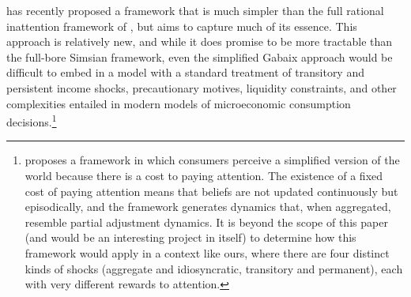 \cite{gabaixSparsityQJE} has recently proposed a framework that is much simpler than the full rational inattention framework of \cite{simsInattention}, but aims to capture much of its essence.  This approach is relatively new, and while it does promise to be more tractable than the full-bore Simsian framework, even the simplified Gabaix approach would be difficult to embed in a model with a standard treatment of transitory and persistent income shocks, precautionary motives, liquidity constraints, and other complexities entailed in modern models of microeconomic consumption decisions.\footnote{\cite{gabaixSparsityQJE} proposes a framework in which consumers perceive a simplified version of the world because there is a cost to paying attention.  The existence of a fixed cost of paying attention means that beliefs are not updated continuously but episodically, and the framework generates dynamics that, when aggregated, resemble partial adjustment dynamics.  It is beyond the scope of this paper (and would be an interesting project in itself) to determine how this framework would apply in a context like ours, where there are four distinct kinds of shocks (aggregate and idiosyncratic, transitory and permanent), each with very different rewards to attention.}
